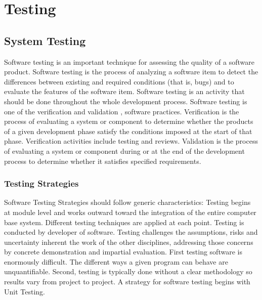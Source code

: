 \documentclass{SureshLimkar}
\begin{document}
\chapter{Testing}

\section{System Testing}
\hspace{0.5 in}Software testing is an important technique for assessing the quality of a software product. Software testing is the process of analyzing a software item to detect the differences between existing and required conditions (that is, bugs) and to evaluate the features of the software item. Software testing is an activity that should be done throughout the whole development process. Software testing is one of the verification and validation , software practices. Verification is the process of evaluating a system or component to determine whether the products of a given development phase satisfy the conditions imposed at the start of that phase. Verification activities include testing and reviews. Validation is the process of evaluating a system or component during or at the end of the development process to determine whether it satisfies specified requirements.
\subsection{Testing Strategies}
\hspace{0.5 in}Software Testing Strategies should follow generic characteristics: Testing begins at module level and works outward toward the integration of the entire computer base system. Different testing techniques are applied at each point. Testing is conducted by developer of software. Testing challenges the assumptions, risks and uncertainty inherent the work of the other disciplines, addressing those concerns by concrete demonstration and impartial evaluation. First testing software is enormously difficult. The different ways a given program can behave are unquantifiable. Second, testing is typically done without a clear methodology so results vary from project to project. A strategy for software testing begins with Unit Testing.
\\
\end{document}
